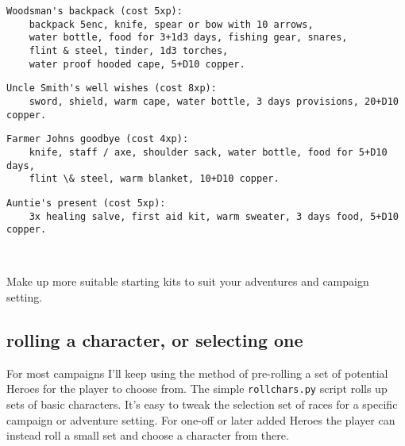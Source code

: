 \goodbreak \small \begin{samepage} \begin{verbatim}
Woodsman's backpack (cost 5xp):
    backpack 5enc, knife, spear or bow with 10 arrows,
    water bottle, food for 3+1d3 days, fishing gear, snares,
    flint & steel, tinder, 1d3 torches,
    water proof hooded cape, 5+D10 copper.
\end{verbatim} \goodbreak \begin{verbatim}
Uncle Smith's well wishes (cost 8xp):
    sword, shield, warm cape, water bottle, 3 days provisions, 20+D10 copper.
\end{verbatim} \goodbreak \begin{verbatim}
Farmer Johns goodbye (cost 4xp):
    knife, staff / axe, shoulder sack, water bottle, food for 5+D10 days,
    flint \& steel, warm blanket, 10+D10 copper.
\end{verbatim} \goodbreak \begin{verbatim}
Auntie's present (cost 5xp):
    3x healing salve, first aid kit, warm sweater, 3 days food, 5+D10 copper.
\end{verbatim} \end{samepage} \normalsize

\

\noindent Make up more suitable starting kits to suit your adventures and campaign setting.


\subsection*{rolling a character, or selecting one}
For most campaigns I'll keep using the method of pre-rolling a set of potential Heroes for the player to choose from. The simple \verb|rollchars.py| script rolls up sets of basic characters. It's easy to tweak the selection set of races for a specific campaign or adventure setting.
For one-off or later added Heroes the player can instead roll a small set and choose a character from there.





